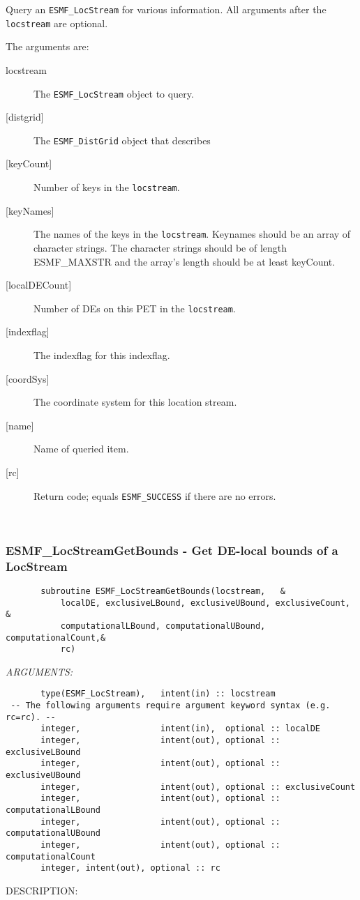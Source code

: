    Query an {\tt ESMF\_LocStream} for various information. All arguments after
   the {\tt locstream} are optional. 
  
   The arguments are:
   \begin{description}
   \item [locstream]
   The {\tt ESMF\_LocStream} object to query.
   \item [{[distgrid]}]
   The {\tt ESMF\_DistGrid} object that describes 
   \item [{[keyCount]}]
   Number of keys in the {\tt locstream}.
   \item [{[keyNames]}]
   The names of the keys in the {\tt locstream}. Keynames should
   be an array of character strings. The character strings should
   be of length ESMF\_MAXSTR and the array's length should be
   at least keyCount. 
   \item [{[localDECount]}]
   Number of DEs on this PET in the {\tt locstream}.
   \item [{[indexflag]}]
   The indexflag for this indexflag.
   \item [{[coordSys]}]
   The coordinate system for this location stream.
   \item [{[name]}]
   Name of queried item.
   \item [{[rc]}]
   Return code; equals {\tt ESMF\_SUCCESS} if there are no errors.
   \end{description} 
 
\mbox{}\hrulefill\ 
 
\subsubsection [ESMF\_LocStreamGetBounds] {ESMF\_LocStreamGetBounds - Get DE-local bounds of a LocStream}


 
\begin{verbatim}       subroutine ESMF_LocStreamGetBounds(locstream,   &
           localDE, exclusiveLBound, exclusiveUBound, exclusiveCount,   &
           computationalLBound, computationalUBound, computationalCount,&
           rc)\end{verbatim}{\em ARGUMENTS:}
\begin{verbatim}       type(ESMF_LocStream),   intent(in) :: locstream
 -- The following arguments require argument keyword syntax (e.g. rc=rc). --
       integer,                intent(in),  optional :: localDE
       integer,                intent(out), optional :: exclusiveLBound
       integer,                intent(out), optional :: exclusiveUBound
       integer,                intent(out), optional :: exclusiveCount
       integer,                intent(out), optional :: computationalLBound
       integer,                intent(out), optional :: computationalUBound
       integer,                intent(out), optional :: computationalCount
       integer, intent(out), optional :: rc\end{verbatim}
{\sf DESCRIPTION:\\ }


